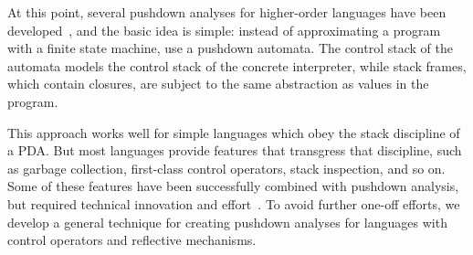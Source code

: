 At this point, several pushdown analyses for higher-order languages
have been developed~\cite{dvanhorn:Vardoulakis2011CFA2,
dvanhorn:Earl2010Pushdown}, and the basic idea is simple: instead of
approximating a program with a finite state machine, use a pushdown
automata.  The control stack of the automata models the control stack
of the concrete interpreter, while stack frames, which contain
closures, are subject to the same abstraction as values in the
program.

This approach works well for simple languages which obey the stack
discipline of a PDA.  But most languages provide features that
transgress that discipline, such as garbage collection, first-class
control operators, stack inspection, and so on.  Some of these
features have been successfully combined with pushdown analysis, but
required technical innovation and
effort~\cite{dvanhorn:Vardoulakis2011Pushdown,
ianjohnson:DBLP:journals/jfp/JohnsonSEMH14,
dvanhorn:Earl2012Introspective}.  To avoid further one-off efforts, we
develop a general technique for creating pushdown analyses for
languages with control operators and reflective mechanisms.
